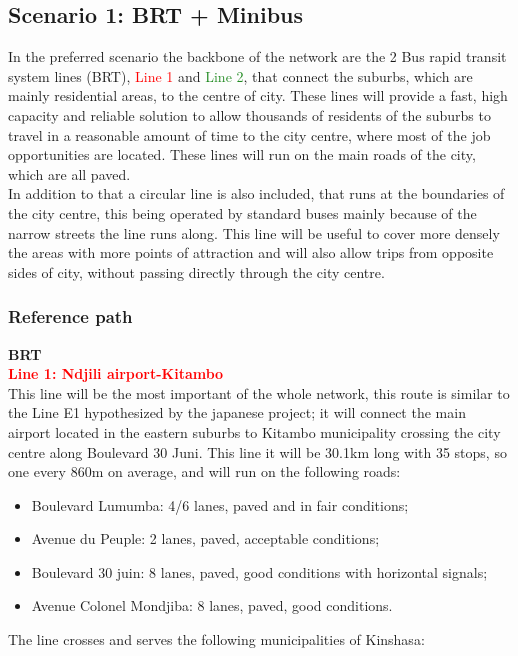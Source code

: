 \documentclass{article}
\begin{document}
\subsection{Scenario 1: BRT + Minibus}
In the preferred scenario the backbone of the network are the 2 Bus rapid transit system lines (BRT), \textcolor{Red} {Line 1} and \textcolor{ForestGreen} {Line 2}, that connect the suburbs, which are mainly residential areas, to the centre of city. These lines will provide a fast, high capacity and reliable solution to allow thousands of residents of the suburbs to travel in a reasonable amount of time to the city centre, where most of the job opportunities are located. These lines will run on the main roads of the city, which are all paved.\\
In addition to that a circular line is also included, that runs at the boundaries of the city centre, this being operated by standard buses mainly because of the narrow streets the line runs along. This line will be useful to cover more densely the areas with more points of attraction and will also allow trips from opposite sides of city, without passing directly through the city centre. 
\subsubsection{Reference path}
\textbf{BRT}\\
\textcolor{Red}{\textbf{Line 1: Ndjili airport-Kitambo}}\\
This line will be the most important of the whole network, this route is similar to the Line E1 hypothesized by the japanese project; it will connect the main airport located in the eastern suburbs to Kitambo municipality crossing the city centre along Boulevard 30 Juni. This line it will be 30.1km long with 35 stops, so one every 860m on average, and will run on the following roads:
\begin{itemize}
\item Boulevard Lumumba: 4/6 lanes, paved and in fair conditions;
\item Avenue du Peuple: 2 lanes, paved, acceptable conditions;
\item Boulevard 30 juin: 8 lanes, paved, good conditions with horizontal signals;
\item Avenue Colonel Mondjiba: 8 lanes, paved, good conditions. 
\end{itemize}
\newpage
The line crosses and serves the following municipalities of Kinshasa:\\
 
\end{document}
